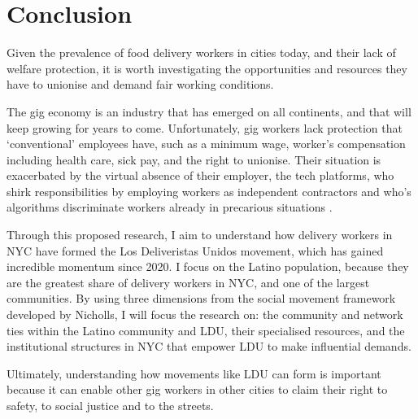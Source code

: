 \documentclass{article}[12pt]
\begin{document}
\vspace{10mm}

\section{Conclusion}

Given the prevalence of food delivery workers in cities today, and their lack of welfare protection, it is worth investigating the opportunities and resources they have to unionise and demand fair working conditions.

The gig economy is an industry that has emerged on all continents, and that will keep growing for years to come. Unfortunately, gig workers lack protection that `conventional’ employees have, such as a minimum wage, worker’s compensation including health care, sick pay, and the right to unionise. Their situation is exacerbated by the virtual absence of their employer, the tech platforms, who shirk responsibilities by employing workers as independent contractors and who’s algorithms discriminate workers already in precarious situations \parencite{kellogg2020algorithms}.

Through this proposed research, I aim to understand how delivery workers in NYC have formed the Los Deliveristas Unidos movement, which has gained incredible momentum since 2020. I focus on the Latino population, because they are the greatest share of delivery workers in NYC, and one of the largest communities.
By using three dimensions from the social movement framework developed by Nicholls, I will focus the research on: the community and network ties within the Latino community and LDU, their specialised resources, and the institutional structures in NYC that empower LDU to make influential demands.

Ultimately, understanding how movements like LDU can form is important because it can enable other gig workers in other cities to claim their right to safety, to social justice and to the streets. 


\printbibliography
\end{document}
